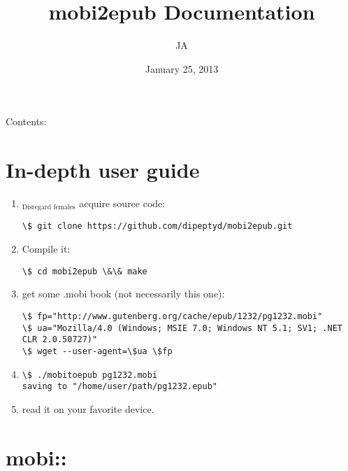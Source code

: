 \documentclass[letterpaper,10pt,english]{sphinxmanual}
\title{mobi2epub Documentation}
\date{January 25, 2013}
\author{JA}
\begin{document}
\maketitle
\tableofcontents
{}\label{index::doc}


Contents:


\chapter{In-depth user guide}
\label{userguide:welcome-to-mobi2epub-s-documentation}\label{userguide:in-depth-user-guide}\label{userguide::doc}\begin{enumerate}
\item {} 
$_{\text{Disregard females}}$ acquire source code:

\begin{Verbatim}[commandchars=\\\{\}]
\$ git clone https://github.com/dipeptyd/mobi2epub.git
\end{Verbatim}

\item {} 
Compile it:

\begin{Verbatim}[commandchars=\\\{\}]
\$ cd mobi2epub \&\& make
\end{Verbatim}

\item {} 
get some .mobi book (not necessarily this one):

\begin{Verbatim}[commandchars=\\\{\}]
\$ fp="http://www.gutenberg.org/cache/epub/1232/pg1232.mobi"
\$ ua="Mozilla/4.0 (Windows; MSIE 7.0; Windows NT 5.1; SV1; .NET CLR 2.0.50727)"
\$ wget --user-agent=\$ua \$fp
\end{Verbatim}

\item {} 
\begin{Verbatim}[commandchars=\\\{\}]
\$ ./mobitoepub pg1232.mobi
saving to "/home/user/path/pg1232.epub"
\end{Verbatim}

\item {} 
read it on your favorite device.

\end{enumerate}


\chapter{mobi::}
\label{mobi:mobi}\label{mobi::doc}
\end{document}
